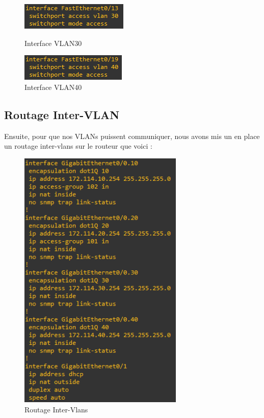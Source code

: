 \documentclass[12pt, a4paper]{article}
\begin{document}
		\begin{figure}[h]
			\begin{minipage}[c]{.46\linewidth}
				\centering
				\includegraphics{../screens/SW/Interface-VLAN30.png}
				\caption{Interface VLAN30}
			\end{minipage}
			\hfill%
			\begin{minipage}[c]{.46\linewidth}
				\centering
				\includegraphics{../screens/SW/Interface-VLAN40.png}
				\caption{Interface VLAN40}
			\end{minipage}
		\end{figure}
		\newpage

		\subsection{Routage Inter-VLAN}
		Ensuite, pour que nos VLANs puissent communiquer, nous avons mis un
		en place un routage inter-vlans sur le routeur que voici :\\
		\begin{figure}[H]
			\centering
			\includegraphics[width=0.7\textwidth]{../screens/routeur/interface.png}
			\caption{Routage Inter-Vlans}
			\label{fig:intervlan}
		\end{figure}
\end{document}
